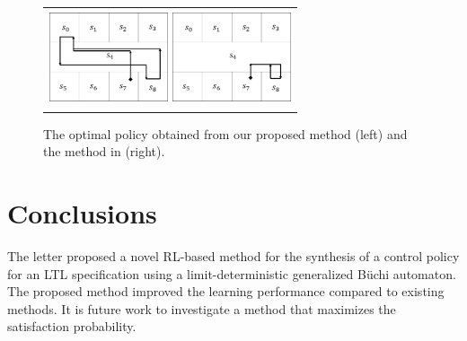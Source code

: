 \documentclass[letterpaper, 10 pt, conference]{ieeeconf}  %
\begin{document}
\begin{figure}[tbp]
	\centering
	\begin{tabular}{c}

		\begin{minipage}{0.499\hsize}
			\includegraphics[bb=0 0 341 256, height = 2.8cm, width=3.5cm]{proposed_policy.png}
		\end{minipage}

		\begin{minipage}{0.499\hsize}
			\centering
			\includegraphics[bb=0 0 341 257, height = 2.8cm, width=3.5cm]{Abate_policy.png}
		\end{minipage}
	\end{tabular}

	\caption{The optimal policy obtained from our proposed method (left) and the method in \cite{HAK2019, HKAKPL2019} (right).}
	\label{optimal}
\end{figure}

\section{Conclusions}

The letter proposed a novel RL-based method for the synthesis of a control policy for an LTL specification using a limit-deterministic generalized B\"{u}chi automaton.
The proposed method improved the learning performance compared to existing methods.
It is future work to investigate a method that maximizes the satisfaction probability.





\end{document}
